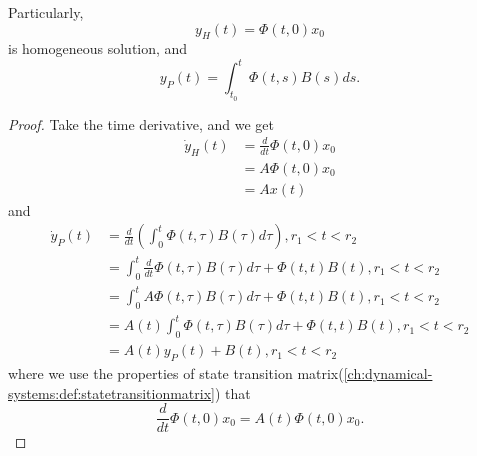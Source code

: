 \begin{refsection}
\begin{theorem}
Particularly, $$y_H(t) = \Phi(t,0)x_0$$ is homogeneous solution, and $$y_P(t) =\int_{t_0}^t \Phi(t,s)B(s)ds .$$
\end{theorem}
\begin{proof}
Take the time derivative, and we get
\begin{align*}
\dot{y}_H(t) &= \frac{d}{dt}\Phi(t,0)x_0 \\
 &= A\Phi(t,0)x_0 \\
 &= Ax(t)
\end{align*}
and
\begin{align*}
\dot{y}_P(t) &= \frac{d}{dt}(\int_{0}^t \Phi(t,\tau)B(\tau)d\tau), r_1<t<r_2 \\
&= \int_0^t \frac{d}{dt} \Phi(t,\tau)B(\tau)d\tau + \Phi(t,t)B(t), r_1<t<r_2 \\
&= \int_0^t  A\Phi(t,\tau)B(\tau)d\tau + \Phi(t,t)B(t), r_1<t<r_2 \\
&= A(t)\int_0^t \Phi(t,\tau)B(\tau)d\tau + \Phi(t,t)B(t), r_1<t<r_2 \\
&= A(t)y_P(t) + B(t), r_1<t<r_2 
\end{align*}
where we use the properties of state transition matrix(\autoref{ch:dynamical-systems:def:statetransitionmatrix}) that
$$\frac{d}{dt}\Phi(t,0)x_0 = A(t)\Phi(t,0)x_0.$$
\end{proof}



\end{refsection}
